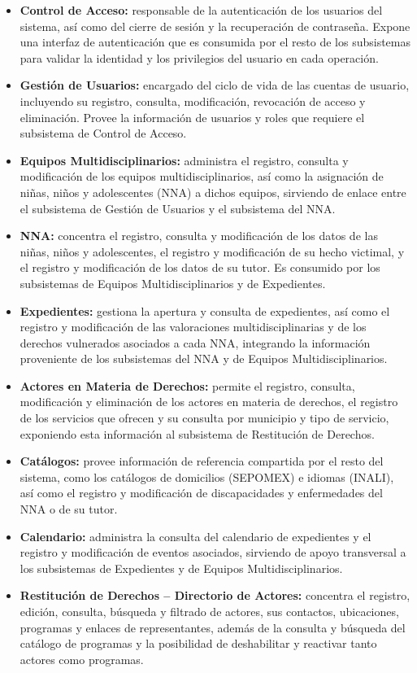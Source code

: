 \begin{itemize}
	\item \textbf{Control de Acceso:} responsable de la autenticación de los usuarios del sistema, así como del cierre de sesión y la recuperación de contraseña. Expone una interfaz de autenticación que es consumida por el resto de los subsistemas para validar la identidad y los privilegios del usuario en cada operación.
	\item \textbf{Gestión de Usuarios:} encargado del ciclo de vida de las cuentas de usuario, incluyendo su registro, consulta, modificación, revocación de acceso y eliminación. Provee la información de usuarios y roles que requiere el subsistema de Control de Acceso.
	\item \textbf{Equipos Multidisciplinarios:} administra el registro, consulta y modificación de los equipos multidisciplinarios, así como la asignación de niñas, niños y adolescentes (NNA) a dichos equipos, sirviendo de enlace entre el subsistema de Gestión de Usuarios y el subsistema del NNA.
	\item \textbf{NNA:} concentra el registro, consulta y modificación de los datos de las niñas, niños y adolescentes, el registro y modificación de su hecho victimal, y el registro y modificación de los datos de su tutor. Es consumido por los subsistemas de Equipos Multidisciplinarios y de Expedientes.
	\item \textbf{Expedientes:} gestiona la apertura y consulta de expedientes, así como el registro y modificación de las valoraciones multidisciplinarias y de los derechos vulnerados asociados a cada NNA, integrando la información proveniente de los subsistemas del NNA y de Equipos Multidisciplinarios.
	\item \textbf{Actores en Materia de Derechos:} permite el registro, consulta, modificación y eliminación de los actores en materia de derechos, el registro de los servicios que ofrecen y su consulta por municipio y tipo de servicio, exponiendo esta información al subsistema de Restitución de Derechos.
	\item \textbf{Catálogos:} provee información de referencia compartida por el resto del sistema, como los catálogos de domicilios (SEPOMEX) e idiomas (INALI), así como el registro y modificación de discapacidades y enfermedades del NNA o de su tutor.
	\item \textbf{Calendario:} administra la consulta del calendario de expedientes y el registro y modificación de eventos asociados, sirviendo de apoyo transversal a los subsistemas de Expedientes y de Equipos Multidisciplinarios.
	\item \textbf{Restitución de Derechos -- Directorio de Actores:} concentra el registro, edición, consulta, búsqueda y filtrado de actores, sus contactos, ubicaciones, programas y enlaces de representantes, además de la consulta y búsqueda del catálogo de programas y la posibilidad de deshabilitar y reactivar tanto actores como programas.
\end{itemize}

